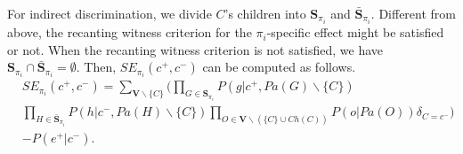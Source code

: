 \documentclass[letterpaper]{article}
\begin{document}
For indirect discrimination, we divide $C$'s children into $\mathbf{S}_{\pi_{i}}$ and $\bar{\mathbf{S}}_{\pi_{i}}$. Different from above, the recanting witness criterion for the $\pi_{i}$-specific effect might be satisfied or not. When the recanting witness criterion is not satisfied, we have $\mathbf{S}_{\pi_{i}}\cap \bar{\mathbf{S}}_{\pi_{i}} = \emptyset$. Then, $SE_{\pi_{i}}(c^{+},c^{-})$ can be computed as follows.
\begin{equation}\label{eq:sei}
\begin{split}
& SE_{\pi_{i}}(c^{+},c^{-}) = \sum_{\mathbf{V}\backslash\{C\}} \bigg(   \prod_{G\in \mathbf{S}_{\pi_{i}}}P(g|c^{+},Pa(G)\backslash \{C\}) \\
&  \prod_{H\in \bar{\mathbf{S}}_{\pi_{i}}}P(h|c^{-},Pa(H)\backslash \{C\}) \!\!\!\!\!\! \prod_{O\in \mathbf{V}\backslash (\{C\}\cup Ch(C))} \!\!\!\!\!\! P(o|Pa(O))\delta_{C=c^{-}} \bigg) \\
& - P(e^{+}|c^{-}).
\end{split}
\end{equation}
\end{document}
